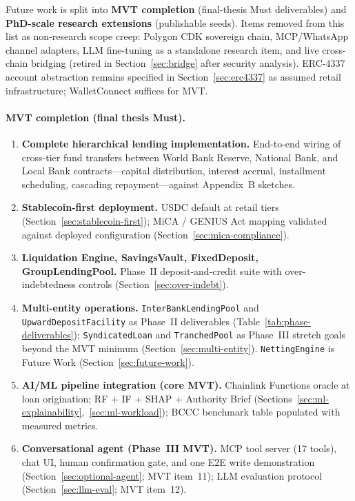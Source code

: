 \documentclass[12pt,a4paper]{report}
\begin{document}
Future work is split into \textbf{MVT completion} (final-thesis Must deliverables) and \textbf{PhD-scale research extensions} (publishable seeds). Items removed from this list as non-research scope creep: Polygon CDK sovereign chain, MCP/WhatsApp channel adapters, LLM fine-tuning as a standalone research item, and live cross-chain bridging (retired in Section~\ref{sec:bridge} after security analysis). ERC-4337 account abstraction remains specified in Section~\ref{sec:erc4337} as assumed retail infrastructure; WalletConnect suffices for MVT.
\label{sec:future-work}

\paragraph{MVT completion (final thesis Must).}
\begin{enumerate}[noitemsep]
\item \textbf{Complete hierarchical lending implementation.} End-to-end wiring of cross-tier fund transfers between World Bank Reserve, National Bank, and Local Bank contracts---capital distribution, interest accrual, installment scheduling, cascading repayment---against Appendix~B sketches.
\item \textbf{Stablecoin-first deployment.} USDC default at retail tiers (Section~\ref{sec:stablecoin-first}); MiCA / GENIUS Act mapping validated against deployed configuration (Section~\ref{sec:mica-compliance}).
\item \textbf{Liquidation Engine, SavingsVault, FixedDeposit, GroupLendingPool.} Phase~II deposit-and-credit suite with over-indebtedness controls (Section~\ref{sec:over-indebt}).
\item \textbf{Multi-entity operations.} \texttt{InterBankLendingPool} and \texttt{UpwardDepositFacility} as Phase~II deliverables (Table~\ref{tab:phase-deliverables}); \texttt{SyndicatedLoan} and \texttt{TranchedPool} as Phase~III stretch goals beyond the MVT minimum (Section~\ref{sec:multi-entity}). \texttt{NettingEngine} is Future Work (Section~\ref{sec:future-work}).
\item \textbf{AI/ML pipeline integration (core MVT).} Chainlink Functions oracle at loan origination; RF + IF + SHAP + Authority Brief (Sections~\ref{sec:ml-explainability},~\ref{sec:ml-workload}); BCCC benchmark table populated with measured metrics.
\item \textbf{Conversational agent (Phase~III MVT).} MCP tool server (17 tools), chat UI, human confirmation gate, and one E2E write demonstration (Section~\ref{sec:optional-agent}; MVT item~11); LLM evaluation protocol (Section~\ref{sec:llm-eval}; MVT item~12).

\end{enumerate}
\end{document}

